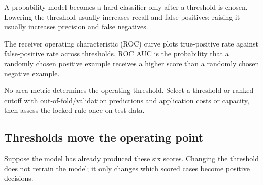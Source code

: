 A probability model becomes a hard classifier only after a threshold is chosen. Lowering the threshold usually increases recall and false positives; raising it usually increases precision and false negatives.

The receiver operating characteristic (ROC) curve plots true-positive rate against false-positive rate across thresholds. ROC AUC is the probability that a randomly chosen positive example receives a higher score than a randomly chosen negative example.

No area metric determines the operating threshold. Select a threshold or ranked cutoff with out-of-fold/validation predictions and application costs or capacity, then assess the locked rule once on test data.

\subsection{Thresholds move the operating point}

Suppose the model has already produced these six scores. Changing the threshold does not retrain the model; it only changes which scored cases become positive decisions.

\begin{mlfigure}
\end{mlfigure}

